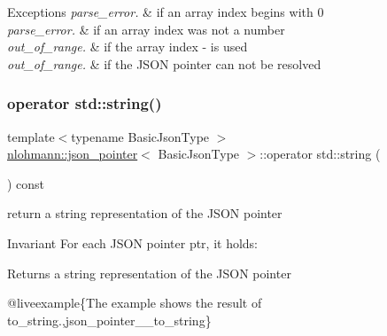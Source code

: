 \begin{DoxyExceptions}{Exceptions}
{\em parse\+\_\+error.} & if an array index begins with \textquotesingle{}0\textquotesingle{} \\
\hline
{\em parse\+\_\+error.} & if an array index was not a number \\
\hline
{\em out\+\_\+of\+\_\+range.} & if the array index \textquotesingle{}-\/\textquotesingle{} is used \\
\hline
{\em out\+\_\+of\+\_\+range.} & if the J\+S\+ON pointer can not be resolved \\
\hline
\end{DoxyExceptions}
\mbox{\label{classnlohmann_1_1json__pointer_ae9015c658f99cf3d48a8563accc79988}} 
\subsubsection{\texorpdfstring{operator std::string()}{operator std::string()}}
{\footnotesize\ttfamily template$<$typename Basic\+Json\+Type $>$ \\
\mbox{\hyperlink{classnlohmann_1_1json__pointer}{nlohmann\+::json\+\_\+pointer}}$<$ Basic\+Json\+Type $>$\+::operator std\+::string (\begin{DoxyParamCaption}{ }\end{DoxyParamCaption}) const\hspace{0.3cm}{\ttfamily [inline]}}



return a string representation of the J\+S\+ON pointer 

\begin{DoxyInvariant}{Invariant}
For each J\+S\+ON pointer {\ttfamily ptr}, it holds\+: 
\begin{DoxyCode}{0}
\end{DoxyCode}

\end{DoxyInvariant}
\begin{DoxyReturn}{Returns}
a string representation of the J\+S\+ON pointer
\end{DoxyReturn}
@liveexample\{The example shows the result of {\ttfamily to\+\_\+string}.,json\+\_\+pointer\+\_\+\+\_\+to\+\_\+string\}

